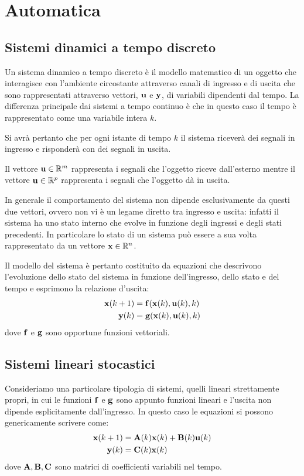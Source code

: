 \section{Automatica}
\subsection{Sistemi dinamici a tempo discreto}

Un sistema dinamico a tempo discreto è il modello matematico di un oggetto che interagisce con l’ambiente circostante attraverso canali di ingresso e di uscita che sono rappresentati attraverso vettori, $\mathbf{u}$ e $\mathbf{y}$, di variabili dipendenti dal tempo. La differenza principale dai sistemi a tempo continuo è che in questo caso il tempo è rappresentato come una variabile intera $k$.

Si avrà pertanto che per ogni istante di tempo $k$ il sistema riceverà dei segnali in ingresso e risponderà con dei segnali in uscita.

Il vettore $\mathbf{u} \in \mathbb{R}^m$ rappresenta i segnali che l’oggetto riceve dall’esterno mentre il vettore $\mathbf{u} \in \mathbb{R}^p$ rappresenta i segnali che l’oggetto dà in uscita.

In generale il comportamento del sistema non dipende esclusivamente da questi due vettori, ovvero non vi è un legame diretto tra ingresso e uscita: infatti il sistema ha uno stato interno che evolve in funzione degli ingressi e degli stati precedenti. In particolare lo stato di un sistema può essere a sua volta rappresentato da un vettore $\mathbf{x} \in \mathbb{R}^n$.

Il modello del sistema è pertanto costituito da equazioni che descrivono l’evoluzione dello stato del sistema in funzione dell’ingresso, dello stato e del tempo e esprimono la relazione d'uscita:
\begin{align*}
\mathbf{x}(k+1) &= \mathbf{f}(\mathbf{x}(k),\mathbf{u}(k),k) \\
\mathbf{y}(k) &= \mathbf{g}(\mathbf{x}(k),\mathbf{u}(k),k)
\end{align*}
dove $\mathbf{f}$ e $\mathbf{g}$ sono opportune funzioni vettoriali.

\subsection{Sistemi lineari stocastici}
Consideriamo una particolare tipologia di sistemi, quelli lineari strettamente propri, in cui le funzioni $\mathbf{f}$ e $\mathbf{g}$ sono appunto funzioni lineari e l’uscita non dipende esplicitamente dall’ingresso. In questo caso le equazioni si possono genericamente scrivere come:
\begin{align*}
\mathbf{x}(k+1) &= \mathbf{A}(k)\mathbf{x}(k) + \mathbf{B}(k)\mathbf{u}(k) \\
\mathbf{y}(k) &= \mathbf{C}(k)\mathbf{x}(k)
\end{align*}
dove $\mathbf{A},\mathbf{B},\mathbf{C}$ sono matrici di coefficienti variabili nel tempo.

